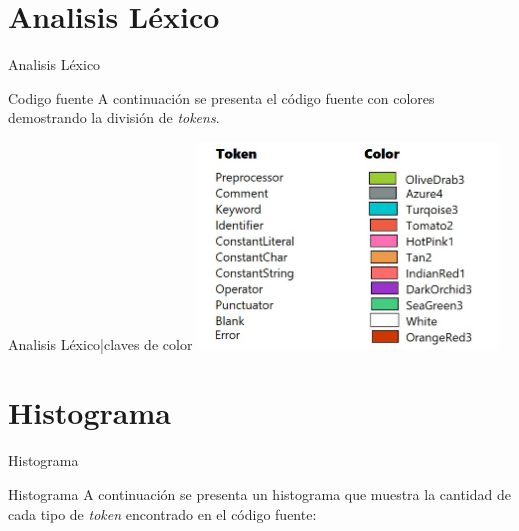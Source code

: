 \documentclass[10pt,xcolor={x11names}]{beamer}
\begin{document}
\section{Analisis Léxico}

\begin{frame}{Analisis Léxico}
        \begin{alertblock}{Codigo fuente}
            A continuación se presenta el código fuente con colores demostrando la división de \textit{tokens}.
            \end{alertblock}
        
\end{frame}

\begin{frame}{Analisis Léxico|claves de color}
\includegraphics[width=8cm]{colors}
\end{frame}



\section{Histograma}
\begin{frame}{Histograma}
        \begin{alertblock}{Histograma}
            A continuación se presenta un histograma que muestra la cantidad de cada tipo de \textit{token} encontrado en el código fuente:
            \end{alertblock}
\end{frame}

\end{document}
